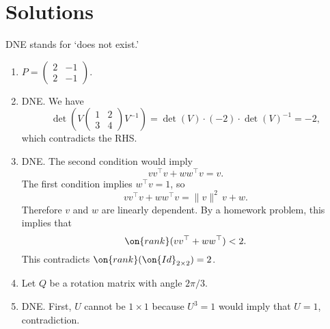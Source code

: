 \documentclass[10pt]{amsart}
\theoremstyle{mythm}
\theoremstyle{definition}
\theoremstyle{myrmk}
\begin{document}
	\newpage
	
	\section*{Solutions} 
	
	\noindent DNE stands for `does not exist.' 
	
	\begin{enumerate}
		\item $P = \begin{pmatrix}
		2 & -1 \\ 2 & -1
		\end{pmatrix}$. 
		\item DNE. We have 
		\[
			\det\left( V \begin{pmatrix}
			1 & 2 \\ 3 & 4 
			\end{pmatrix} V^{-1} \right) = \det(V) \cdot (-2) \cdot \det(V)^{-1} = -2, 
		\]
		which contradicts the RHS. 
		\item DNE. The second condition would imply 
		\[
			vv^\top v + ww^\top v = v. 
		\]
		The first condition implies $w^\top v = 1$, so 
		\[
			vv^\top v + ww^\top v = \lVert v \rVert^2 \, v + w. 
		\]
		Therefore $v$ and $w$ are linearly dependent. By a homework problem, this implies that 
		\[
			\on{rank}(vv^\top + ww^\top) < 2. 
		\]
		This contradicts $\on{rank}(\on{Id}_{2 \times 2}) = 2$. 
		\item Let $Q$ be a rotation matrix with angle $2\pi / 3$. 
		\item DNE. First, $U$ cannot be $1 \times 1$ because $U^3 = 1$ would imply that $U = 1$, contradiction. 
		

\end{enumerate}
\end{document}
